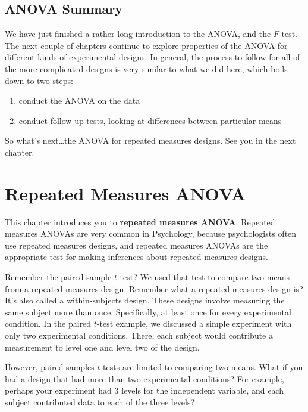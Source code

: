 \documentclass[
  letterpaper,
  DIV=11,
  numbers=noendperiod]{scrreprt}
\providecommand{\tightlist}{%
  \setlength{\itemsep}{0pt}\setlength{\parskip}{0pt}}
\begin{document}
\section{ANOVA Summary}\label{anova-summary}

We have just finished a rather long introduction to the ANOVA, and the
\(F\)-test. The next couple of chapters continue to explore properties
of the ANOVA for different kinds of experimental designs. In general,
the process to follow for all of the more complicated designs is very
similar to what we did here, which boils down to two steps:

\begin{enumerate}
\def\labelenumi{\arabic{enumi})}
\tightlist
\item
  conduct the ANOVA on the data
\item
  conduct follow-up tests, looking at differences between particular
  means
\end{enumerate}

So what's next\ldots the ANOVA for repeated measures designs. See you in
the next chapter.


\chapter{Repeated Measures ANOVA}\label{repeated-measures-anova}

This chapter introduces you to \textbf{repeated measures ANOVA}.
Repeated measures ANOVAs are very common in Psychology, because
psychologists often use repeated measures designs, and repeated measures
ANOVAs are the appropriate test for making inferences about repeated
measures designs.

Remember the paired sample \(t\)-test? We used that test to compare two
means from a repeated measures design. Remember what a repeated measures
design is? It's also called a within-subjects design. These designs
involve measuring the same subject more than once. Specifically, at
least once for every experimental condition. In the paired \(t\)-test
example, we discussed a simple experiment with only two experimental
conditions. There, each subject would contribute a measurement to level
one and level two of the design.

However, paired-samples \(t\)-tests are limited to comparing two means.
What if you had a design that had more than two experimental conditions?
For example, perhaps your experiment had 3 levels for the independent
variable, and each subject contributed data to each of the three levels?
\end{document}
